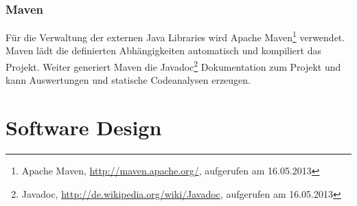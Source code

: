\subsubsection{Maven}
Für die Verwaltung der externen Java Libraries wird Apache Maven\footnote{Apache Maven, \url{http://maven.apache.org/}, aufgerufen am 16.05.2013} verwendet. Maven lädt die definierten Abhängigkeiten automatisch und kompiliert das Projekt. Weiter generiert Maven die Javadoc\footnote{Javadoc, \url{http://de.wikipedia.org/wiki/Javadoc}, aufgerufen am 16.05.2013} Dokumentation zum Projekt und kann Auswertungen und statische Codeanalysen erzeugen.

\section{Software Design}
